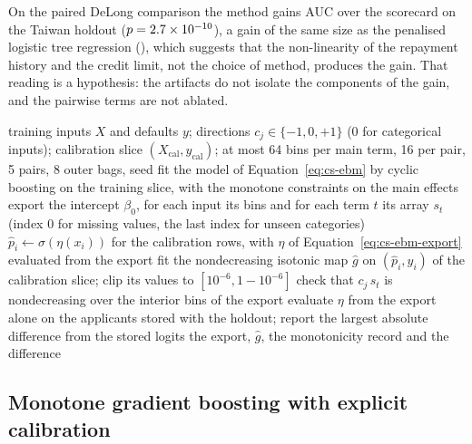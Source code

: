 On the paired DeLong comparison the method gains \csHoEbDlDiff{} AUC over the scorecard on the Taiwan holdout ($p=2.7\times10^{-10}{}$),
a gain of the same size as the penalised logistic tree regression (\csHoPlDlDiff{}), which suggests that the non-linearity of the
repayment history and the credit limit, not the choice of method, produces the gain. That reading is a hypothesis: the artifacts
do not isolate the components of the gain, and the pairwise terms are not ablated.

\begin{algorithm}[htbp]
\caption{Fit of the explainable boosting machine, its export, the isotonic map and the checks of the export}
\label{alg:cs-ebm}
\begin{algorithmic}[1]
\Require training inputs $X$ and defaults $y$; directions $c_j\in\{-1,0,+1\}$ (0 for categorical inputs); calibration slice $(X_{\mathrm{cal}},y_{\mathrm{cal}})$; at most 64 bins per main term, 16 per pair, 5 pairs, 8 outer bags, seed
\State fit the model of Equation~\eqref{eq:cs-ebm} by cyclic boosting on the training slice, with the monotone constraints on the main effects
\State export the intercept $\beta_0$, for each input its bins and for each term $t$ its array $s_t$ (index 0 for missing values, the last index for unseen categories)
\State $\hat p_i\gets\sigma(\eta(x_i))$ for the calibration rows, with $\eta$ of Equation~\eqref{eq:cs-ebm-export} evaluated from the export
\State fit the nondecreasing isotonic map $\hat g$ on $(\hat p_i,y_i)$ of the calibration slice; clip its values to $[10^{-6},1-10^{-6}]$
 \State check that $c_j\,s_t$ is nondecreasing over the interior bins of the export \EndFor
\State evaluate $\eta$ from the export alone on the applicants stored with the holdout; report the largest absolute difference from the stored logits
\State \Return the export, $\hat g$, the monotonicity record and the difference
\end{algorithmic}
\end{algorithm}

\subsection{Monotone gradient boosting with explicit calibration}
\label{sec:m5}

